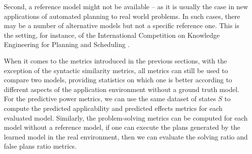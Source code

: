 \documentclass{article}
\theoremstyle{definition}
\theoremstyle{remark}
\begin{document}
Second, a reference model might not be available -- as it is usually the case in new applications of automated planning to real world problems. In such cases, there may be a number of alternative models but not a specific reference one. This is the setting, for instance, of the International Competition on Knowledge Engineering for Planning and Scheduling \citep{DBLP:journals/aim/ChrpaMVV17}.


When it comes to the metrics introduced in the previous sections, with the exception of the syntactic similarity metrics, all metrics 
can still be used to compare two models,  
providing statistics on which one is better according to different aspects of the application environment without a ground truth model. 
For the predictive power metrics, we can use the same dataset of states $S$ to compute the predicted applicability and predicted effects metrics for each evaluated model. Similarly, the problem-solving metrics can be computed for each model without a reference model, if one can execute the plans generated by the learned model in the real environment, then we can evaluate the solving ratio and false plans ratio metrics. 





\end{document}
